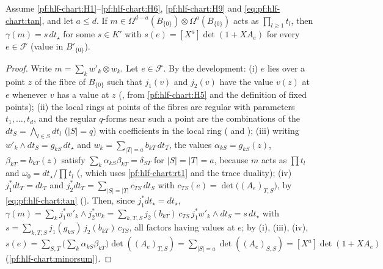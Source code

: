 \begin{lemma}\label{pf:hlf-chart:valg}
Assume \ref{pf:hlf-chart:H1}--\ref{pf:hlf-chart:H6}, \ref{pf:hlf-chart:H9} and \eqref{eq:pf:hlf-chart:tan}, and let $a\le d$. If
$m\in\Omega^{d-a}(B_{\{0\}})\otimes\Omega^a(B_{\{0\}})$ acts as $\prod_{l\ge1}t_l$, then $\gamma(m)=s\,dt_\star$ for some $s\in K'$ with
$s(e)=[X^a]\det(1+XA_e)$ for every $e\in\mathcal F$ (value in $B'_{\{0\}}$).
\end{lemma}

\begin{proof}
Write $m=\sum_kw'_k\otimes w_k$. Let $e\in\mathcal F$. By the development: (i) $e$ lies over a point $z$ of the fibre of $B_{\{0\}}$ such that $j_1(v)$
and $j_2(v)$ have the value $v(z)$ at $e$ whenever $v$ has a value at $z$
(, from \ref{pf:hlf-chart:H5} and the definition of fixed points); (ii) the local rings at
points of the fibres are regular with parameters $t_1,\dots,t_d$, and the regular $q$-forms near such a point are the combinations of the
$dt_S=\bigwedge_{l\in S}dt_l$ ($|S|=q$) with coefficients in the local ring
( and ); (iii) writing
$w'_k\wedge dt_S=g_{kS}\,dt_\star$ and $w_k=\sum_{|T|=a}b_{kT}\,dt_T$, the values $\alpha_{kS}=g_{kS}(z)$, $\beta_{kT}=b_{kT}(z)$ satisfy
$\sum_k\alpha_{kS}\beta_{kT}=\delta_{ST}$ for $|S|=|T|=a$, because $m$ acts as $\prod t_l$ and $\omega_0=dt_\star/\prod t_l$
(, which uses \cref{pf:hlf-chart:rt1} and the trace duality); (iv)
$j_1^*dt_T=dt_T$ and $j_2^*dt_T=\sum_{|S|=|T|}c_{TS}\,dt_S$ with $c_{TS}(e)=\det\bigl((A_e)_{T,S}\bigr)$, by \eqref{eq:pf:hlf-chart:tan}
(). Then, since $j_1^*dt_\star=dt_\star$,
$\gamma(m)=\sum_kj_1^*w'_k\wedge j_2^*w_k=\sum_{k,T,S}j_2(b_{kT})\,c_{TS}\,j_1^*w'_k\wedge dt_S=s\,dt_\star$ with
$s=\sum_{k,T,S}j_1(g_{kS})\,j_2(b_{kT})\,c_{TS}$, all factors having values at $e$; by (i), (iii), (iv),
$s(e)=\sum_{S,T}\bigl(\sum_k\alpha_{kS}\beta_{kT}\bigr)\det((A_e)_{T,S})=\sum_{|S|=a}\det((A_e)_{S,S})=[X^a]\det(1+XA_e)$ (\cref{pf:hlf-chart:minorsum}).
\end{proof}

